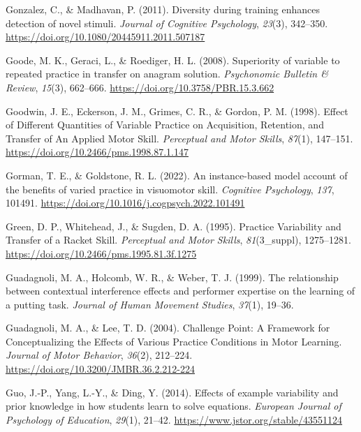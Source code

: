 \documentclass[
  11pt,
  letterpaper,
]{article}
\newlength{\cslhangindent}
\newenvironment{CSLReferences}[2] %
 {\begin{list}{}{%
  \setlength{\itemindent}{0pt}
  \setlength{\leftmargin}{0pt}
  \setlength{\parsep}{0pt}
  \ifodd #1
   \setlength{\leftmargin}{\cslhangindent}
   \setlength{\itemindent}{-1\cslhangindent}
  \fi
  \setlength{\itemsep}{#2\baselineskip}}}
 {\end{list}}
\begin{document}
\begin{CSLReferences}{1}{0}
Gonzalez, C., \& Madhavan, P. (2011). Diversity during training enhances
detection of novel stimuli. \emph{Journal of Cognitive Psychology},
\emph{23}(3), 342--350.
\url{https://doi.org/10.1080/20445911.2011.507187}

Goode, M. K., Geraci, L., \& Roediger, H. L. (2008). Superiority of
variable to repeated practice in transfer on anagram solution.
\emph{Psychonomic Bulletin \& Review}, \emph{15}(3), 662--666.
\url{https://doi.org/10.3758/PBR.15.3.662}

Goodwin, J. E., Eckerson, J. M., Grimes, C. R., \& Gordon, P. M. (1998).
Effect of {Different Quantities} of {Variable Practice} on
{Acquisition}, {Retention}, and {Transfer} of {An Applied Motor Skill}.
\emph{Perceptual and Motor Skills}, \emph{87}(1), 147--151.
\url{https://doi.org/10.2466/pms.1998.87.1.147}

Gorman, T. E., \& Goldstone, R. L. (2022). An instance-based model
account of the benefits of varied practice in visuomotor skill.
\emph{Cognitive Psychology}, \emph{137}, 101491.
\url{https://doi.org/10.1016/j.cogpsych.2022.101491}

Green, D. P., Whitehead, J., \& Sugden, D. A. (1995). Practice
{Variability} and {Transfer} of a {Racket Skill}. \emph{Perceptual and
Motor Skills}, \emph{81}(3\_suppl), 1275--1281.
\url{https://doi.org/10.2466/pms.1995.81.3f.1275}

Guadagnoli, M. A., Holcomb, W. R., \& Weber, T. J. (1999). The
relationship between contextual interference effects and performer
expertise on the learning of a putting task. \emph{Journal of Human
Movement Studies}, \emph{37}(1), 19--36.

Guadagnoli, M. A., \& Lee, T. D. (2004). Challenge {Point}: {A
Framework} for {Conceptualizing} the {Effects} of {Various Practice
Conditions} in {Motor Learning}. \emph{Journal of Motor Behavior},
\emph{36}(2), 212--224. \url{https://doi.org/10.3200/JMBR.36.2.212-224}

Guo, J.-P., Yang, L.-Y., \& Ding, Y. (2014). Effects of example
variability and prior knowledge in how students learn to solve
equations. \emph{European Journal of Psychology of Education},
\emph{29}(1), 21--42. \url{https://www.jstor.org/stable/43551124}


\end{CSLReferences}
\end{document}
